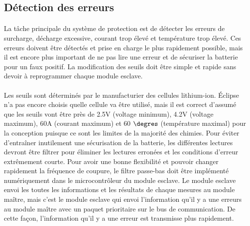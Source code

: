 
\subsection{Détection des erreurs}
	\paragraph*{}
	La tâche principale du système de protection est de détecter les erreurs de surcharge, décharge excessive, courant trop élevé et température trop élevé. Ces erreurs doivent être détectés et prise en charge le plus rapidement possible, mais il est encore plus important de ne pas lire une erreur et de sécuriser la batterie pour un faux positif. La modification des seuils doit être simple et rapide sans devoir à reprogrammer chaque module esclave. 

	\paragraph*{}
	Les seuils sont déterminés par le manufacturier des cellules lithium-ion. Éclipse n'a pas encore choisis quelle cellule va être utilisé, mais il est correct d'assumé que les seuils vont être près de 2.5V (voltage minimum), 4.2V (voltage maximum), 60A (courant maximum) et 60 $\degres$ (température maximal) pour la conception puisque ce sont les limites de la majorité des chimies. Pour éviter d'entraîner inutilement une sécurisation de la batterie, les différentes lectures devront être filtrer pour éliminer les lectures erronées et les conditions d'erreur extrêmement courte. Pour avoir une bonne flexibilité et pouvoir changer rapidement la fréquence de coupure, le filtre passe-bas doit être implémenté numériquement dans le microcontrôleur du module esclave. Le module esclave envoi les toutes les informations et les résultats de chaque mesures au module maître, mais c'est le module esclave qui envoi l'information qu'il y a une erreurs au module maître avec un paquet prioritaire sur le bus de communication. De cette façon, l'information qu'il y a une erreur est transmisse plus rapidement.
 